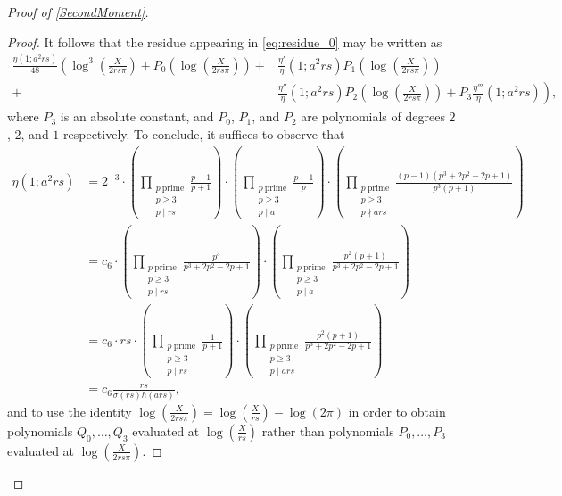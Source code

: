 \documentclass[10pt,a4paper]{amsart}
\theoremstyle{plain}
\theoremstyle{definition}
\theoremstyle{remark}
\begin{document}
\begin{proof}[Proof of \cref{SecondMoment}]
\begin{proof}
It follows that the residue appearing in \eqref{eq:residue_0} may be written as
\begin{align*}
\frac{\eta(1;a^2rs)}{48}\left(
\log^3\left(\frac{X}{2rs\pi}\right)+P_0\left(\log\left(\frac{X}{2rs\pi}\right)\right)\right.
+&\frac{\eta'}{\eta}
(1;a^2rs)P_1\left(\log\left(\frac{X}{2rs\pi}\right)\right)
\\
+&\left.\frac{\eta''}{\eta}(1;a^2rs)P_2\left(\log\left(\frac{X}{2rs\pi}\right)\right)+P_3\frac{\eta'''}{\eta}(1;a^2rs)\right),
\end{align*}
where $P_3$ is an absolute constant, and $P_0$, $P_1$, and $P_2$ are polynomials of degrees $2$, $2$, and $1$ respectively.
To conclude, it suffices to observe that 
\begin{align*}
    \eta(1;a^2rs) &= 2^{-3} \cdot \left( \prod_{\substack{p \ \text{prime} \\ p \geq 3 \\ p \mid rs}} \frac{p-1}{p + 1} \right) \cdot \left( \prod_{\substack{p \ \text{prime} \\ p \geq 3 \\ p \mid a}} \frac{p-1}{p} \right) \cdot \left( \prod_{\substack{p \ \text{prime} \\ p \geq 3 \\ p \nmid ars}} \frac{(p-1)(p^3+2p^2-2p+1)}{p^3(p+1)} \right) \\
    &= c_6 \cdot \left( \prod_{\substack{p \ \text{prime} \\ p \geq 3 \\ p \mid rs}} \frac{p^3}{p^3 + 2 p^2 - 2p + 1} \right) \cdot \left( \prod_{\substack{p \ \text{prime} \\ p \geq 3 \\ p \mid a}} \frac{p^2 (p+1)}{p^3+2p^2-2p+1} \right) \\ 
    &= c_6 \cdot rs \cdot \left( \prod_{\substack{p \ \text{prime} \\ p \geq 3 \\ p \mid rs}} \frac{1}{p+1} \right) \cdot \left( \prod_{\substack{p \ \text{prime} \\ p \geq 3 \\ p \mid ars}} \frac{p^2 (p+1)}{p^3 + 2p^2 - 2p + 1} \right)
    \\ &= c_6 \frac{rs}{\sigma(rs)h(ars)},
\end{align*}
and to use the identity $\log(\frac{X}{2rs\pi})=\log(\frac{X}{rs})-\log(2\pi)$ in order to obtain polynomials $Q_0,\dots,Q_3$ evaluated at $\log(\frac{X}{rs})$ rather than polynomials $P_0,\dots,P_3$ evaluated at $\log(\frac{X}{2rs\pi})$.
\end{proof}


\end{proof}
\end{document}
